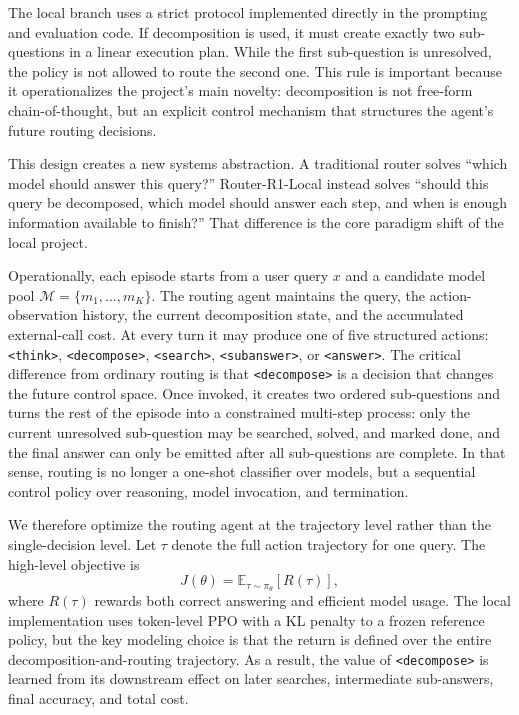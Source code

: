 \documentclass{article}
\begin{document}
The local branch uses a strict protocol implemented directly in the prompting and evaluation code. If decomposition is used, it must create exactly two sub-questions in a linear execution plan. While the first sub-question is unresolved, the policy is not allowed to route the second one. This rule is important because it operationalizes the project's main novelty: decomposition is not free-form chain-of-thought, but an explicit control mechanism that structures the agent's future routing decisions.

This design creates a new systems abstraction. A traditional router solves ``which model should answer this query?'' Router-R1-Local instead solves ``should this query be decomposed, which model should answer each step, and when is enough information available to finish?'' That difference is the core paradigm shift of the local project.

Operationally, each episode starts from a user query $x$ and a candidate model pool $\mathcal{M} = \{m_1, \dots, m_K\}$. The routing agent maintains the query, the action-observation history, the current decomposition state, and the accumulated external-call cost. At every turn it may produce one of five structured actions: \texttt{<think>}, \texttt{<decompose>}, \texttt{<search>}, \texttt{<subanswer>}, or \texttt{<answer>}. The critical difference from ordinary routing is that \texttt{<decompose>} is a decision that changes the future control space. Once invoked, it creates two ordered sub-questions and turns the rest of the episode into a constrained multi-step process: only the current unresolved sub-question may be searched, solved, and marked done, and the final answer can only be emitted after all sub-questions are complete. In that sense, routing is no longer a one-shot classifier over models, but a sequential control policy over reasoning, model invocation, and termination.

We therefore optimize the routing agent at the trajectory level rather than the single-decision level. Let $\tau$ denote the full action trajectory for one query. The high-level objective is
\begin{equation}
J(\theta) = \mathbb{E}_{\tau \sim \pi_\theta}[R(\tau)],
\end{equation}
where $R(\tau)$ rewards both correct answering and efficient model usage. The local implementation uses token-level PPO with a KL penalty to a frozen reference policy, but the key modeling choice is that the return is defined over the entire decomposition-and-routing trajectory. As a result, the value of \texttt{<decompose>} is learned from its downstream effect on later searches, intermediate sub-answers, final accuracy, and total cost.
\end{document}
